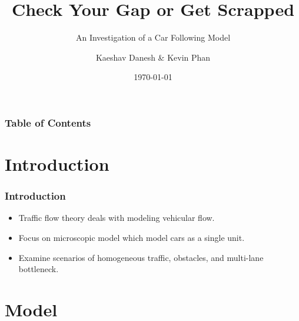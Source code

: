 \documentclass{beamer}
\title[An Investigation of a Car Following Model]{Check Your Gap or Get Scrapped}
\subtitle{An Investigation of a Car Following Model}
\author[Kaeshav Danesh \& Kevin Phan]{Kaeshav Danesh \& Kevin Phan}
\date{\today}
\begin{document}
\frame{\titlepage}

\begin{frame}
    \frametitle{Table of Contents}
    \tableofcontents
    \end{frame}

\section{Introduction}

\begin{frame}
\frametitle{Introduction}
\begin{itemize}
  \item Traffic flow theory deals with modeling vehicular flow.  
  \item Focus on microscopic model which model cars as a single unit.
  \item Examine scenarios of homogeneous traffic, obstacles, and multi-lane bottleneck. 
\end{itemize}
\end{frame}

\section{Model}
\end{document}
